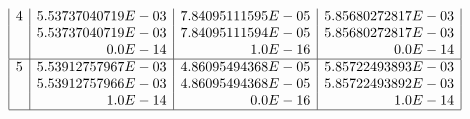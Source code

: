 \begin{description}
\begin{table}
\[\begin{array}{| r | r | r | r |}
4 &  5.53737040719E-03 &  7.84095111595E-05 &  5.85680272817E-03 \\
  &  5.53737040719E-03 &  7.84095111594E-05 &  5.85680272817E-03 \\
  &            0.0E-14 &            1.0E-16 &            0.0E-14 \\
\hline

5 &  5.53912757967E-03 &  4.86095494368E-05 &  5.85722493893E-03 \\
  &  5.53912757966E-03 &  4.86095494368E-05 &  5.85722493892E-03 \\
  &            1.0E-14 &            0.0E-16 &            1.0E-14 \\
\hline

\end{array} \]
\end{table}
\end{description}

\newpage
\boilerplatetraceability

\newpage
\boilerplatemetrics
